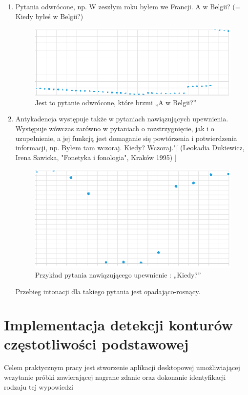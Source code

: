 \documentclass[a4paper,12 pt]{article}
\begin{document}
\begin{enumerate}
\begin{enumerate}
\item Pytania odwrócone, np. W zeszłym roku byłem we Francji. A w Belgii? (= Kiedy byłeś w Belgii?) 
\begin{figure}[h]
\centering
\includegraphics[scale=0.9]{pytanie_odwrocone.png}
\caption{Jest to pytanie odwrócone, które brzmi „A w Belgii?”}
\end{figure}
\FloatBarrier
\item Antykadencja występuje  także w pytaniach nawiązujących upewnienia. Występuje wówczas zarówno w  pytaniach o rozstrzygnięcie, jak i o uzupełnienie, a jej funkcją jest domaganie  się powtórzenia i potwierdzenia informacji, np. Byłem tam wczoraj. Kiedy?  Wczoraj."[  (Leokadia Dukiewicz, Irena Sawicka, "Fonetyka i fonologia", Kraków 1995) ]
\begin{figure}[h]

\centering
\includegraphics[scale=0.9]{kiedy.png}
\caption{Przykład pytania nawiązującego upewnienie : „Kiedy?”}
\end{figure}
\FloatBarrier
Przebieg intonacji dla takiego pytania jest opadająco-rosnący.
\end{enumerate}
\end{enumerate}
\section{Implementacja detekcji konturów częstotliwości podstawowej}
Celem praktycznym pracy jest stworzenie aplikacji desktopowej umożliwiającej wczytanie próbki zawierającej nagrane zdanie oraz dokonanie identyfikacji rodzaju tej wypowiedzi
\end{document}
